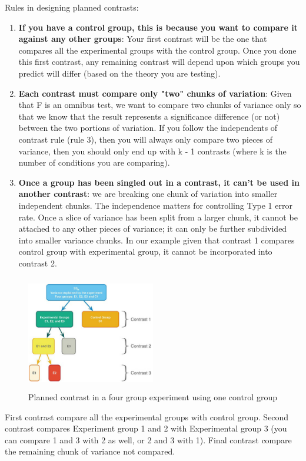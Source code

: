 Rules in designing planned contrasts:
\begin{enumerate}
\item \textbf{If you have a control group, this is because you want to compare it against any other groups}: Your first contrast will be the one that compares all the experimental groups with the control group. Once you done this first contrast, any remaining contrast will depend upon which groups you predict will differ (based on the theory you are testing). 
\item \textbf{Each contrast must compare only "two" chunks of variation}: Given that F is an omnibus test, we want to compare two chunks of variance only so that we know that the result represents a significance difference (or not) between the two portions of variation. If you follow the independents of contrast rule (rule 3), then you will always only compare two pieces of variance, then you should only end up with k - 1 contrasts (where k is the number of conditions you are comparing). 
\item \textbf{Once a group has been singled out in a contrast, it can't be used in another contrast}: we are breaking one chunk of variation into smaller independent chunks. The independence matters for controlling Type 1 error rate. Once a slice of variance has been split from a larger chunk, it cannot be attached to any other pieces of variance; it can only be further subdivided into smaller variance chunks. In our example given that contrast 1 compares control group with experimental group, it cannot be incorporated into contrast 2. 
\end{enumerate}


\begin{figure}[h]
	\includegraphics[width=0.5\textwidth,height=50mm]{Chapter 12 GLM 1 Comparing Several Independent Means ANOVA/plannedcontrast2.PNG}
	\caption{Planned contrast in a four group experiment using one control group}
\end{figure}

First contrast compare all the experimental groups with control group. Second contrast compares Experiment group 1 and 2 with Experimental group 3 (you can compare 1 and 3 with 2 as well, or 2 and 3 with 1). Final contrast compare the remaining chunk of variance not compared. 

